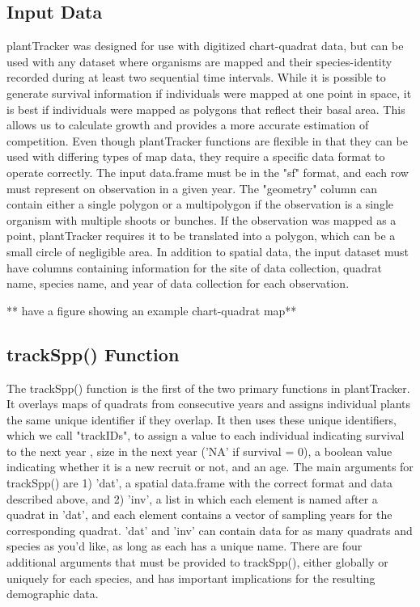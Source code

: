 \documentclass[12pt, letterpaper]{article}
\begin{document}
\subsection{Input Data}
plantTracker was designed for use with digitized chart-quadrat data, but can be used with any dataset where organisms are mapped and their species-identity recorded during at least two sequential time intervals. While it is possible to generate survival information if individuals were mapped at one point in space, it is best if individuals were mapped as polygons that reflect their basal area. This allows us to calculate growth and provides a more accurate estimation of competition. Even though plantTracker functions are flexible in that they can be used with differing types of map data, they require a specific data format to operate correctly. The input data.frame must be in the "sf" format, and each row must represent on observation in a given year. The "geometry" column can contain either a single polygon or a multipolygon if the observation is a single organism with multiple shoots or bunches. If the observation was mapped as a point, plantTracker requires it to be translated into a polygon, which can be a small circle of negligible area. In addition to spatial data, the input dataset must have columns containing information for the site of data collection, quadrat name, species name, and year of data collection for each observation. 

** have a figure showing an example chart-quadrat map**

\subsection{trackSpp() Function}
The trackSpp() function is the first of the two primary functions in plantTracker. It overlays maps of quadrats from consecutive years and assigns individual plants the same unique identifier if they overlap. It then uses these unique identifiers, which we call "trackIDs", to assign a value to each individual indicating survival to the next year , size in the next year ('NA' if survival = 0), a boolean value indicating whether it is a new recruit or not, and an age. The main arguments for trackSpp() are 1) 'dat', a spatial data.frame with the correct format and data described above, and 2) 'inv', a list in which each element is named after a quadrat in 'dat', and each element contains a vector of sampling years for the corresponding quadrat. 'dat' and 'inv' can contain data for as many quadrats and species as you'd like, as long as each has a unique name. There are four additional arguments that must be provided to trackSpp(), either globally or uniquely for each species, and has important implications for the resulting demographic data. 
\end{document}
